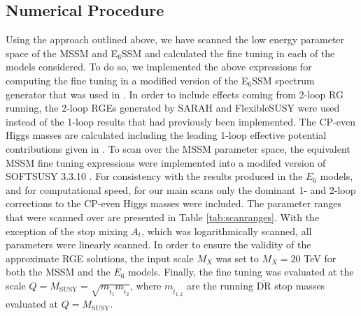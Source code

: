\documentclass[preprint,amsmath,amssymb,aps,superscriptaddress,prd,showpacs,floatfix]{revtex4-1}
\begin{document}
\subsection{\label{subsec:numericalprocedure}Numerical Procedure}
Using the approach outlined above, we have scanned the low energy parameter space of the MSSM and E$_6$SSM and calculated the fine tuning in each of the models considered. To do so, we implemented the above expressions for computing the fine tuning in a modified version of the E$_6$SSM spectrum generator that was used in \cite{Athron:2013ipa}. In order to include effects coming from 2-loop RG running, the 2-loop RGEs generated by SARAH \cite{Staub:2009bi,Staub:2010jh,Staub:2012pb,Staub:2013tta} and FlexibleSUSY \cite{Athron:2014yba} were used instead of the 1-loop results that had previously been implemented. The CP-even Higgs masses are calculated including the leading 1-loop effective potential contributions given in \cite{Athron:2009bs}. To scan over the MSSM parameter space, the equivalent MSSM fine tuning expressions were implemented into a modifed version of SOFTSUSY 3.3.10 \cite{Allanach:2001kg,Allanach:2013kza}. For consistency with the results produced in the $E_6$ models, and for computational speed, for our main scans only the dominant 1- and 2-loop corrections to the CP-even Higgs masses were included. The parameter ranges that were scanned over are presented in Table \ref{tab:scanranges}. With the exception of the stop mixing $A_t$, which was logarithmically scanned, all parameters were linearly scanned. In order to ensure the validity of the approximate RGE solutions, the input scale $M_X$ was set to $M_X=20$ TeV for both the MSSM and the $E_6$ models. Finally, the fine tuning was evaluated at the scale $Q=M_{\textrm{SUSY}}=\sqrt{m_{\tilde{t}_1}m_{\tilde{t}_2}}$, where $m_{\tilde{t}_{1,2}}$ are the running $\overline{\textrm{DR}}$ stop masses evaluated at $Q=M_{\textrm{SUSY}}$. 
\end{document}
